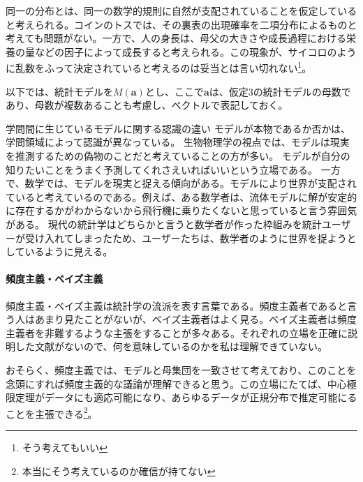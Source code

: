 同一の分布とは、同一の数学的規則に自然が支配されていることを仮定していると考えられる。コインのトスでは、その裏表の出現確率を二項分布によるものと考えても問題がない。一方で、人の身長は、母父の大きさや成長過程における栄養の量などの因子によって成長すると考えられる。この現象が、サイコロのように乱数をふって決定されていると考えるのは妥当とは言い切れない\footnote{そう考えてもいい}。


以下では、統計モデルを$M(\bm{a})$とし、ここで$\bm{a}$は、仮定3の統計モデルの母数であり、母数が複数あることも考慮し、ベクトルで表記しておく。

\begin{SMbox}{学問間に生じているモデルに関する認識の違い}
モデルが本物であるか否かは、学問領域によって認識が異なっている。
生物物理学の視点では、モデルは現実を推測するための偽物のことだと考えていることの方が多い。
モデルが自分の知りたいことをうまく予測してくれさえいればいいという立場である。
一方で、数学では、モデルを現実と捉える傾向がある。モデルにより世界が支配されていると考えているのである。例えば、ある数学者は、流体モデルに解が安定的に存在するかがわからないから飛行機に乗りたくないと思っていると言う雰囲気がある。
現代の統計学はどちらかと言うと数学者が作った枠組みを統計ユーザーが受け入れてしまったため、ユーザーたちは、数学者のように世界を捉ようとしているように見える。
\end{SMbox}


\begin{mybox}
    \paragraph{頻度主義・ベイズ主義}
    頻度主義・ベイズ主義は統計学の流派を表す言葉である。頻度主義者であると言う人はあまり見たことがないが、ベイズ主義者はよく見る。ベイズ主義者は頻度主義者を非難するような主張をすることが多々ある。それぞれの立場を正確に説明した文献がないので、何を意味しているのかを私は理解できていない。

    おそらく、頻度主義では、モデルと母集団を一致させて考えており、このことを念頭にすれば頻度主義的な議論が理解できると思う。この立場にたてば、中心極限定理がデータにも適応可能になり、あらゆるデータが正規分布で推定可能にることを主張できる\footnote{本当にそう考えているのか確信が持てない}。
\end{mybox}
\fi


